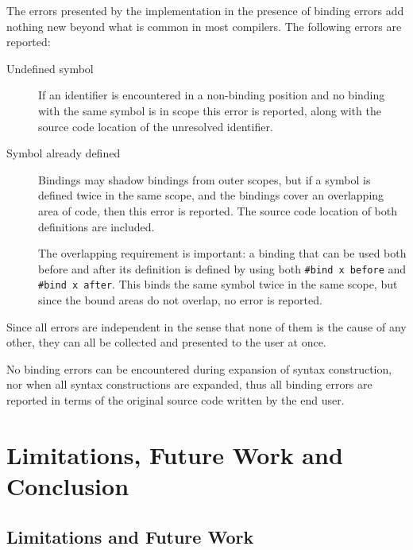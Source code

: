 \documentclass{kththesis}
\begin{document}
The errors presented by the implementation in the presence of binding errors add nothing new beyond what is common in most compilers. The following errors are reported:

\begin{description}
  \item[Undefined symbol] If an identifier is encountered in a non-binding position and no binding with the same symbol is in scope this error is reported, along with the source code location of the unresolved identifier.

  \item[Symbol already defined] Bindings may shadow bindings from outer scopes, but if a symbol is defined twice in the same scope, and the bindings cover an overlapping area of code, then this error is reported. The source code location of both definitions are included.

  The overlapping requirement is important: a binding that can be used both before and after its definition is defined by using both \texttt{#bind x before} and \texttt{#bind x after}. This binds the same symbol twice in the same scope, but since the bound areas do not overlap, no error is reported.
\end{description}

Since all errors are independent in the sense that none of them is the cause of any other, they can all be collected and presented to the user at once.

No binding errors can be encountered during expansion of syntax construction, nor when all syntax constructions are expanded, thus all binding errors are reported in terms of the original source code written by the end user.

\chapter{Limitations, Future Work and Conclusion}

\section{Limitations and Future Work}
\end{document}
